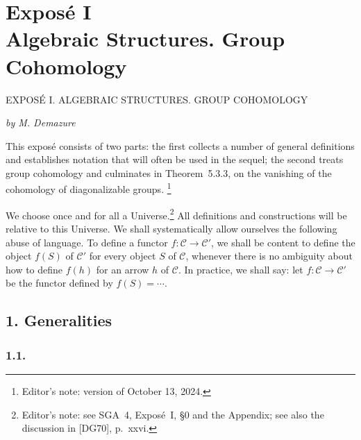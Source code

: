 
\setcounter{footnote}{0}
\chapter*{Expos\'e I\\Algebraic Structures. Group Cohomology}
%
  {EXPOS\'E I. ALGEBRAIC STRUCTURES. GROUP COHOMOLOGY}

\begin{center}
  \textit{by M. Demazure}
\end{center}

This expos\'e consists of two parts: the first collects a number of general
definitions and establishes notation that will often be used in the sequel;
the second treats group cohomology and culminates in Theorem~5.3.3, on the
vanishing of the cohomology of diagonalizable groups.
\footnote{Editor's note: version of October 13, 2024.}

We choose once and for all a Universe.\footnote{Editor's note: see SGA~4,
Expos\'e~I, \S0 and the Appendix; see also the discussion in [DG70], p.~xxvi.}
All definitions and constructions will be relative to this Universe. We shall
systematically allow ourselves the following abuse of language. To define a
functor \(f:\mathscr C\to\mathscr C'\), we shall be content to define the
object \(f(S)\) of \(\mathscr C'\) for every object \(S\) of \(\mathscr C\),
whenever there is no ambiguity about how to define \(f(h)\) for an arrow \(h\)
of \(\mathscr C\). In practice, we shall say: let
\(f:\mathscr C\to\mathscr C'\) be the functor defined by
\(f(S)=\cdots\).

\section*{1. Generalities}

\subsection*{1.1.}

